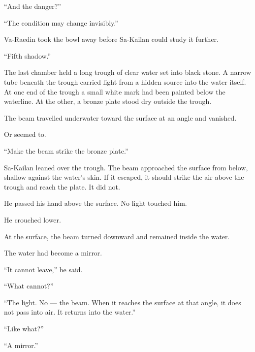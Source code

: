 “And the danger?”\par

“The condition may change invisibly.”\par

Va-Raedin took the bowl away before Sa-Kailan could study it further.\par

“Fifth shadow.”\par

The last chamber held a long trough of clear water set into black stone.
A narrow tube beneath the trough carried light from a hidden source into the water itself.
At one end of the trough a small white mark had been painted below the waterline.
At the other, a bronze plate stood dry outside the trough.\par

The beam travelled underwater toward the surface at an angle and vanished.\par

Or seemed to.\par

“Make the beam strike the bronze plate.”\par

Sa-Kailan leaned over the trough.
The beam approached the surface from below, shallow against the water’s skin.
If it escaped, it should strike the air above the trough and reach the plate.
It did not.\par

He passed his hand above the surface.
No light touched him.\par

He crouched lower.\par

At the surface, the beam turned downward and remained inside the water.\par

The water had become a mirror.\par

“It cannot leave,” he said.\par

“What cannot?”\par

“The light.
No — the beam.
When it reaches the surface at that angle, it does not pass into air.
It returns into the water.”\par

“Like what?”\par

“A mirror.”\par

